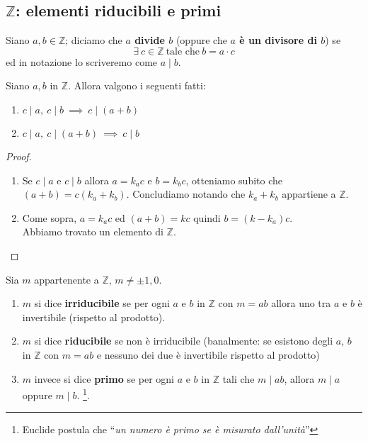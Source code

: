 \subsection{$\mathbb{Z}$: elementi riducibili e primi}
\begin{definizione}[Divisore] Siano $a,b \in \mathbb{Z}$; diciamo che \textbf{$a$ divide $b$} (oppure che \textbf{$a$ è un divisore di $b$}) se 
	\begin{equation*}
	\exists \ c \in \mathbb{Z} \ \text{tale che} \ b = a \cdot c
	\end{equation*}
	ed in notazione lo scriveremo come $a \mid  b$.
\end{definizione}
\begin{proposizione}
	Siano $a,b$ in $\mathbb{Z}$. Allora valgono i seguenti fatti:
	\begin{enumerate}
		\item $c\mid a, \ c\mid b \ \implies \ c\mid (a+b)$
		\item $c\mid a, \ c\mid (a+b) \ \implies \ c\mid b$
	\end{enumerate}
\end{proposizione}
\begin{proof}\ 
\begin{enumerate}
	\item Se $c\mid a$ e $c\mid b$ allora $a=k_a c$ e $b = k_b c$, otteniamo subito che $(a+b)=c(k_a+k_b)$. Concludiamo notando che $k_a+k_b$ appartiene a $\mathbb{Z}$.
	\item Come sopra, $a=k_ac$ ed $(a+b)=kc$ quindi $b=(k-k_a)c$. \\ Abbiamo trovato un elemento di $\mathbb{Z}$.
\end{enumerate}
\end{proof}
\begin{definizione}
	Sia $m$ appartenente a $\mathbb{Z}$, $m \neq \pm 1, 0$.
	\begin{enumerate}
		\item $m$ si dice \textbf{irriducibile} se per ogni $a$ e $b$ in $\mathbb{Z}$ con $m=ab$ allora uno tra $a$ e $b$ è invertibile (rispetto al prodotto).
		\item $m$ si dice \textbf{riducibile} se non è irriducibile (banalmente: se esistono degli $a$, $b$ in $\mathbb{Z}$ con $m=ab$ e nessuno dei due è invertibile rispetto al prodotto)
		\item $m$ invece si dice \textbf{primo} se per ogni $a$ e $b$ in $\mathbb{Z}$ tali che $m\mid ab$, allora $m\mid a$ oppure $m\mid b$. \footnote{Euclide postula che \enquote{\textit{un numero è primo se è misurato dall'unità}}}.
	\end{enumerate}
\end{definizione}
